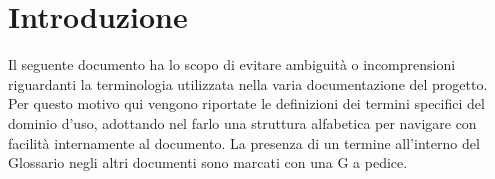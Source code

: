 \section{Introduzione}
Il seguente documento ha lo scopo di evitare ambiguità o incomprensioni riguardanti la terminologia utilizzata nella varia documentazione del progetto. Per questo motivo qui vengono riportate le definizioni dei termini specifici del dominio d'uso, adottando nel farlo una struttura alfabetica per navigare con facilità internamente al documento.
La presenza di un termine all'interno del Glossario negli altri documenti sono marcati con una G a pedice.